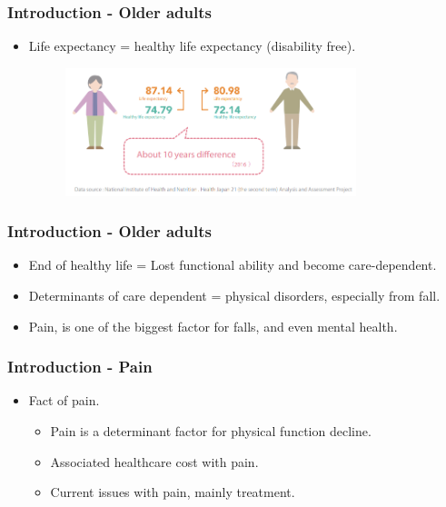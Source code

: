 \documentclass[dvipdfmx]{beamer}\usepackage[]{graphicx}\usepackage[]{color}
\begin{document}
\begin{frame}
	\frametitle{Introduction - Older adults}
	\begin{itemize}
		\item Life expectancy = healthy life expectancy (disability free).
			\begin{figure}[H]
				\centering
				\includegraphics [width=0.8\textwidth, height=0.6\textheight] {img/healthylife_jp.PNG}
			\end{figure}
	\end{itemize}
\end{frame}

\begin{frame}
	\frametitle{Introduction - Older adults}
	\begin{itemize}
		\item End of healthy life = Lost functional ability and become care-dependent.
		\item Determinants of care dependent = physical disorders, especially from fall. 
		\item Pain, is one of the biggest factor for falls, and even mental health.
			\begin{figure}[H]
				\centering
				
			\end{figure}
	\end{itemize}
\end{frame}

\begin{frame}
	\frametitle{Introduction - Pain}
	\begin{itemize}
		\item Fact of pain.
			\begin{itemize}
				\item Pain is a determinant factor for physical function decline.
				\item Associated healthcare cost with pain.
				\item Current issues with pain, mainly treatment.
			\end{itemize}

	\end{itemize}
\end{frame}
\end{document}
